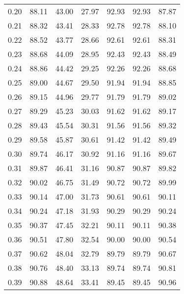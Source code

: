 \begin{tabular}{|c|c|c|c|c|c|c|}
      0.20 &     88.11 &     43.00 &      27.97 &   92.93 &      92.93 &         87.87 \\
      0.21 &     88.32 &     43.41 &      28.33 &   92.78 &      92.78 &         88.10 \\
      0.22 &     88.52 &     43.77 &      28.66 &   92.61 &      92.61 &         88.31 \\
      0.23 &     88.68 &     44.09 &      28.95 &   92.43 &      92.43 &         88.49 \\
      0.24 &     88.86 &     44.42 &      29.25 &   92.26 &      92.26 &         88.68 \\
      0.25 &     89.00 &     44.67 &      29.50 &   91.94 &      91.94 &         88.85 \\
      0.26 &     89.15 &     44.96 &      29.77 &   91.79 &      91.79 &         89.02 \\
      0.27 &     89.29 &     45.23 &      30.03 &   91.62 &      91.62 &         89.17 \\
      0.28 &     89.43 &     45.54 &      30.31 &   91.56 &      91.56 &         89.32 \\
      0.29 &     89.58 &     45.87 &      30.61 &   91.42 &      91.42 &         89.49 \\
      0.30 &     89.74 &     46.17 &      30.92 &   91.16 &      91.16 &         89.67 \\
      0.31 &     89.87 &     46.41 &      31.16 &   90.87 &      90.87 &         89.82 \\
      0.32 &     90.02 &     46.75 &      31.49 &   90.72 &      90.72 &         89.99 \\
      0.33 &     90.14 &     47.00 &      31.73 &   90.61 &      90.61 &         90.11 \\
      0.34 &     90.24 &     47.18 &      31.93 &   90.29 &      90.29 &         90.24 \\
      0.35 &     90.37 &     47.45 &      32.21 &   90.11 &      90.11 &         90.38 \\
      0.36 &     90.51 &     47.80 &      32.54 &   90.00 &      90.00 &         90.54 \\
      0.37 &     90.62 &     48.04 &      32.79 &   89.79 &      89.79 &         90.67 \\
      0.38 &     90.76 &     48.40 &      33.13 &   89.74 &      89.74 &         90.81 \\
      0.39 &     90.88 &     48.64 &      33.41 &   89.45 &      89.45 &         90.96 \\

\end{tabular}
